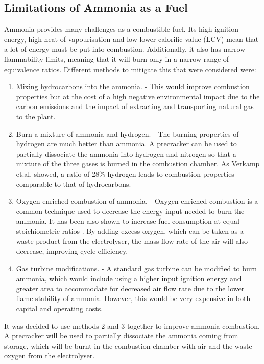 \subsection{Limitations of Ammonia as a Fuel \cite{verkamp}}
Ammonia provides many challenges as a combustible fuel. Its high ignition energy, high heat of vapourisation and low lower calorific value (LCV) mean that a lot of energy must be put into combustion. Additionally, it also has narrow flammability limits, meaning that it will burn only in a narrow range of equivalence ratios.  Different methods to mitigate this that were considered were:
\begin {enumerate}
\item Mixing hydrocarbons into the ammonia. - This would improve combustion properties but at the cost of a high negative environmental impact due to the carbon emissions and the impact of extracting and transporting natural gas to the plant. 
\item Burn a mixture of ammonia and hydrogen. - The burning properties of hydrogen are much better than ammonia. A precracker can be used to partially dissociate the ammonia into hydrogen and nitrogen so that a mixture of the three gases is burned in the combustion chamber. As Verkamp et.al. showed, a ratio of 28\% hydrogen leads to combustion properties comparable to that of hydrocarbons. 
\item Oxygen enriched combustion of ammonia. - Oxygen enriched combustion is a common technique used to decrease the energy input needed to burn the ammonia. It has been also shown to increase fuel consumption at equal stoichiometric ratios \cite{baskar}. By adding excess oxygen, which can be taken as a waste product from the electrolyser, the mass flow rate of the air will also decrease, improving cycle efficiency. 
\item Gas turbine modifications. - A standard gas turbine can be modified to burn ammonia, which would include using a higher input ignition energy and greater area to accommodate for decreased air flow rate due to the lower flame stability of ammonia. However, this would be very expensive in both capital and operating costs.
\end {enumerate}

It was decided to use methods 2 and 3 together to improve ammonia combustion. A precracker will be used to partially dissociate the ammonia coming from storage, which will be burnt in the combustion chamber with air and the waste oxygen from the electrolyser.

